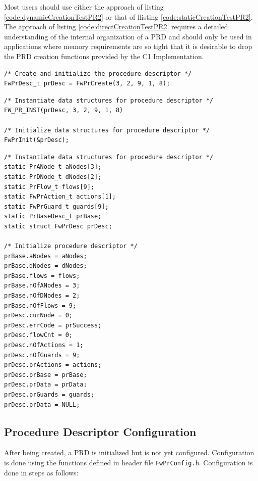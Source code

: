 \documentclass[a4paper,10pt]{article}
\begin{document}
Most users should use either the approach of listing \ref{code:dynamicCreationTestPR2} or that of llisting
\ref{code:staticCreationTestPR2}. The approach of listing \ref{code:directCreationTestPR2} 
requires a detailed understanding of the internal organization of a PRD and should only be used in 
applications where memory requirements are so tight that it is desirable to drop the PRD creation 
functions provided by the C1 Implementation.

\begin{lstlisting}
/* Create and initialize the procedure descriptor */
FwPrDesc_t prDesc = FwPrCreate(3, 2, 9, 1, 8);
\end{lstlisting}

\begin{lstlisting}
/* Instantiate data structures for procedure descriptor */
FW_PR_INST(prDesc, 3, 2, 9, 1, 8)

/* Initialize data structures for procedure descriptor */
FwPrInit(&prDesc);
\end{lstlisting}

\begin{lstlisting}
/* Instantiate data structures for procedure descriptor */
static PrANode_t aNodes[3];	        
static PrDNode_t dNodes[2]; 	        
static PrFlow_t flows[9];	        
static FwPrAction_t actions[1]; 
static FwPrGuard_t guards[9];	
static PrBaseDesc_t prBase;
static struct FwPrDesc prDesc;

/* Initialize procedure descriptor */
prBase.aNodes = aNodes;
prBase.dNodes = dNodes;
prBase.flows = flows;
prBase.nOfANodes = 3;
prBase.nOfDNodes = 2;
prBase.nOfFlows = 9;
prDesc.curNode = 0;
prDesc.errCode = prSuccess;
prDesc.flowCnt = 0;
prDesc.nOfActions = 1;
prDesc.nOfGuards = 9;
prDesc.prActions = actions;
prDesc.prBase = prBase;
prDesc.prData = prData;
prDesc.prGuards = guards;
prDesc.prData = NULL;
\end{lstlisting}

\subsection{Procedure Descriptor Configuration}\label{sec:prConfig}
After being created, a PRD is initialized but is not yet configured. Configuration is done using the functions defined 
in header file \texttt{FwPrConfig.h}. Configuration is done in steps as follows:
\end{document}
